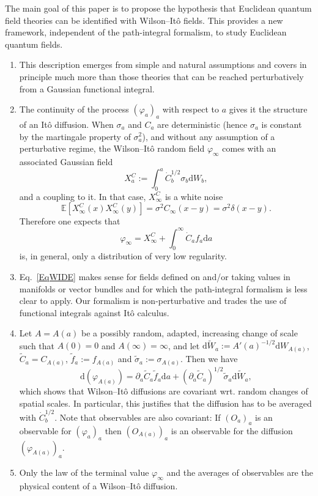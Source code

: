 \documentclass[reprint,aps]{revtex4-2}
\newcommand{\assign}{:=}
\newcommand{\mathd}{\mathrm{d}}
\newenvironment{enumeratealpha}{\begin{enumerate}[a{\textup{)}}] }{\end{enumerate}}
\begin{document}
The main goal of this paper is to propose the hypothesis that Euclidean
quantum field theories can be identified with Wilson--It{\^o} fields. This
provides a new framework, independent of the path-integral formalism, to study
Euclidean quantum fields.
\begin{enumeratealpha}
  \item This description emerges from simple and natural assumptions and
  covers in principle much more than those theories that can be reached
  perturbatively from a Gaussian functional integral.
  
  \item The continuity of the process $(\varphi_a)_a$ with respect to $a$
  gives it the structure of an It{\^o} diffusion. When $\sigma_a$ and $C_a$
  are deterministic (hence $\sigma_a$ is constant by the martingale property
  of $\sigma_a^2$), and without any assumption of a perturbative regime, the
  Wilson--It{\^o} random field $\varphi_{\infty}$ comes with an associated
  Gaussian field
  \[ X^C_a \assign \int_0^a \dot{C}^{1 / 2}_b \sigma_b \mathd W_b, \]
  and a coupling to it. In that case, $X^C_{\infty}$ is a white noise
  \[ \mathbb{E} [X^C_{\infty} (x) X^C_{\infty} (y)] = \sigma^2 C_{\infty} (x -
     y) = \sigma^2 \delta (x - y) . \]
  Therefore one expects that
  \[ \varphi_{\infty} = X_{\infty}^C + \int_0^{\infty} \dot{C}_a f_a \mathd a
  \]
  is, in general, only a distribution of very low regularity.
  
  \item Eq.~\eqref{EqWIDE} makes sense for fields defined on and/or taking
  values in manifolds or vector bundles and for which the path-integral
  formalism is less clear to apply. Our formalism is non-perturbative and
  trades the use of functional integrals against It{\^o} calculus.
  
  \item Let $A = A (a)$ be a possibly random, adapted, increasing change of
  scale such that $A (0) = 0$ and $A (\infty) = \infty$, and let $\mathd
  \tilde{W}_a \assign A' (a)^{- 1 / 2} \mathd W_{A (a)}$, $\tilde{C}_a = C_{A
  (a)}$, $\tilde{f}_a \assign f_{A (a)}$ and $\tilde{\sigma}_a \assign
  \sigma_{A (a)}$. Then we have
  \[ \mathd (\varphi_{A (a)}) = \partial_a \tilde{C}_a  \tilde{f}_a \mathd a +
     (\partial_a \tilde{C}_a)^{1 / 2}  \tilde{\sigma}_a \mathd \tilde{W}_a, \]
  which shows that Wilson--It{\^o} diffusions are covariant wrt. random
  changes of spatial scales. In particular, this justifies that the diffusion
  has to be averaged with $\dot{C}_b^{1 / 2}$. Note that observables are also
  covariant: If $(O_a)_a$ is an observable for $(\varphi_a)_a$ then $(O_{A
  (a)})_a$ is an observable for the diffusion $(\varphi_{A (a)})_a$.
  
  \item Only the law of the terminal value $\varphi_{\infty}$ and the averages
  of observables are the physical content of a Wilson--It{\^o} diffusion.
\end{enumeratealpha}
\end{document}
